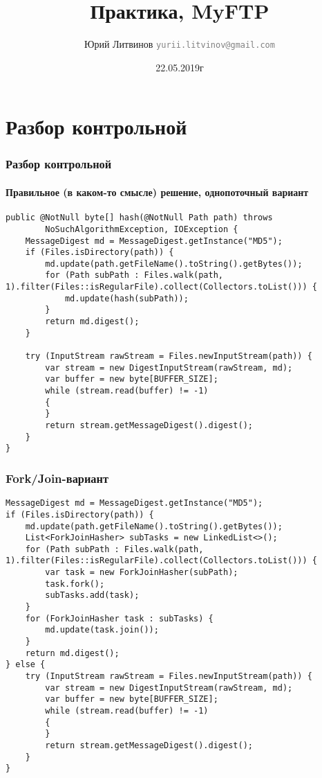 \documentclass[xetex,mathserif,serif]{beamer}
\title{Практика, MyFTP}
\author[Юрий Литвинов]{Юрий Литвинов \newline \textcolor{gray}{\small\texttt{yurii.litvinov@gmail.com}}}
\date{22.05.2019г}
\begin{document}
	
	\frame{\titlepage}
	
	\section{Разбор контрольной}

	\begin{frame}[fragile]
		\frametitle{Разбор контрольной}
		\framesubtitle{Правильное (в каком-то смысле) решение, однопоточный вариант}
		\begin{scriptsize}
			\begin{verbatim}
public @NotNull byte[] hash(@NotNull Path path) throws 
        NoSuchAlgorithmException, IOException {
    MessageDigest md = MessageDigest.getInstance("MD5");
    if (Files.isDirectory(path)) {
        md.update(path.getFileName().toString().getBytes());
        for (Path subPath : Files.walk(path, 1).filter(Files::isRegularFile).collect(Collectors.toList())) {
            md.update(hash(subPath));
        }
        return md.digest();
    }

    try (InputStream rawStream = Files.newInputStream(path)) {
        var stream = new DigestInputStream(rawStream, md);
        var buffer = new byte[BUFFER_SIZE];
        while (stream.read(buffer) != -1)
        {
        }
        return stream.getMessageDigest().digest();
    }
}
			\end{verbatim}
		\end{scriptsize}
\end{frame}

	\begin{frame}[fragile]
		\frametitle{Fork/Join-вариант}
		\begin{scriptsize}
			\begin{verbatim}
MessageDigest md = MessageDigest.getInstance("MD5");
if (Files.isDirectory(path)) {
    md.update(path.getFileName().toString().getBytes());
    List<ForkJoinHasher> subTasks = new LinkedList<>();
    for (Path subPath : Files.walk(path, 1).filter(Files::isRegularFile).collect(Collectors.toList())) {
        var task = new ForkJoinHasher(subPath);
        task.fork();
        subTasks.add(task);
    }
    for (ForkJoinHasher task : subTasks) {
        md.update(task.join());
    }
    return md.digest();
} else {
    try (InputStream rawStream = Files.newInputStream(path)) {
        var stream = new DigestInputStream(rawStream, md);
        var buffer = new byte[BUFFER_SIZE];
        while (stream.read(buffer) != -1)
        {
        }
        return stream.getMessageDigest().digest();
    }
}
			\end{verbatim}
		\end{scriptsize}
	\end{frame}
\end{document}
